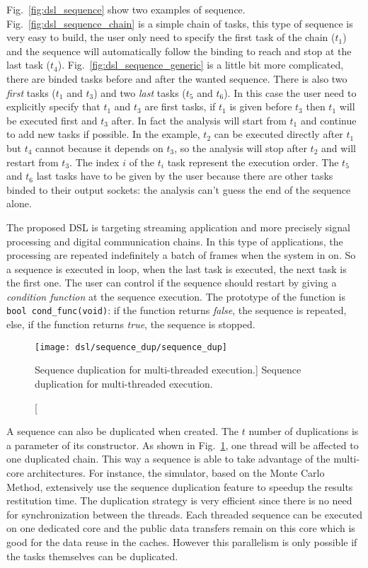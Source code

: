 Fig.~\ref{fig:dsl_sequence} show two examples of sequence.
Fig.~\ref{fig:dsl_sequence_chain} is a simple chain of tasks, this type of
sequence is very easy to build, the user only need to specify the first task of
the chain ($t_1$) and the sequence will automatically follow the binding to
reach and stop at the last task ($t_4$). Fig.~\ref{fig:dsl_sequence_generic} is
a little bit more complicated, there are binded tasks before and after the
wanted sequence. There is also two \emph{first} tasks ($t_1$ and $t_3$) and
two \emph{last} tasks ($t_5$ and $t_6$). In this case the user need to
explicitly specify that $t_1$ and $t_3$ are first tasks, if $t_1$ is given
before $t_3$ then $t_1$ will be executed first and $t_3$ after. In fact the
analysis will start from $t_1$ and continue to add new tasks if possible. In the
example, $t_2$ can be executed directly after $t_1$ but $t_4$ cannot because it
depends on $t_3$, so the analysis will stop after $t_2$ and will restart from
$t_3$. The index $i$ of the $t_i$ task represent the execution order. The $t_5$
and $t_6$ last tasks have to be given by the user because there are other tasks
binded to their output sockets: the analysis can't guess the end of the sequence
alone.

The proposed DSL is targeting streaming application and more precisely signal
processing and digital communication chains. In this type of applications, the
processing are repeated indefinitely a batch of frames when the system in on. So
a sequence is executed in loop, when the last task is executed, the next task is
the first one. The user can control if the sequence should restart by giving a
\emph{condition function} at the sequence execution. The prototype of the
function is \verb|bool cond_func(void)|: if the function returns \emph{false},
the sequence is repeated, else, if the function returns \emph{true}, the
sequence is stopped.

\begin{figure}[htp]
  \centering
  \texttt{[image: dsl/sequence\_dup/sequence\_dup]}
  \caption
    [Sequence duplication for multi-threaded execution.]
    {Sequence duplication for multi-threaded execution.}
  \label{fig:dsl_sequence_dup}
\end{figure}

A sequence can also be duplicated when created. The $t$ number of duplications
is a parameter of its constructor. As shown in Fig.~\ref{fig:dsl_sequence_dup},
one thread will be affected to one duplicated chain. This way a sequence is able
to take advantage of the multi-core architectures. For instance, the \AFFECT
simulator, based on the Monte Carlo Method, extensively use the sequence
duplication feature to speedup the results restitution time. The duplication
strategy is very efficient since there is no need for synchronization between
the threads. Each threaded sequence can be executed on one dedicated core and
the public data transfers remain on this core which is good for the data reuse
in the caches. However this parallelism is only possible if the tasks themselves
can be duplicated.

